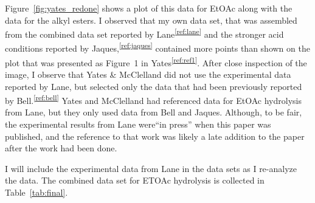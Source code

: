 \documentclass[]{tufte-handout}
\newcommand{\tss}[1]{\textsuperscript{#1}}
\begin{document}
Figure~\vref{fig:yates_redone} shows a plot of this data for EtOAc along with the data for the alkyl esters. I observed that my own data set, that was assembled from the combined data set reported by Lane\tss{\ref{ref:lane}} and the stronger acid conditions reported by Jaques,\tss{\ref{ref:jaques}} contained more points than shown on the plot that was presented as Figure~1 in Yates\tss{\ref{ref:ref1}}. After close inspection of the image, I observe that Yates \& McClelland did not use the experimental data reported by Lane, but selected only the data that had been previously reported by Bell.\tss{\ref{ref:bell}}  Yates and McClelland had referenced data for EtOAc hydrolysis from Lane, but they only used data from Bell and Jaques. Although, to be fair, the experimental results from Lane were``in press'' when this paper was published, and the reference to that work was likely a late addition to the paper after the work had been done.

I will include the experimental data from Lane in the data sets as I re-analyze the data. The combined data set for ETOAc hydrolysis is collected in Table~\ref{tab:final}.
\end{document}
